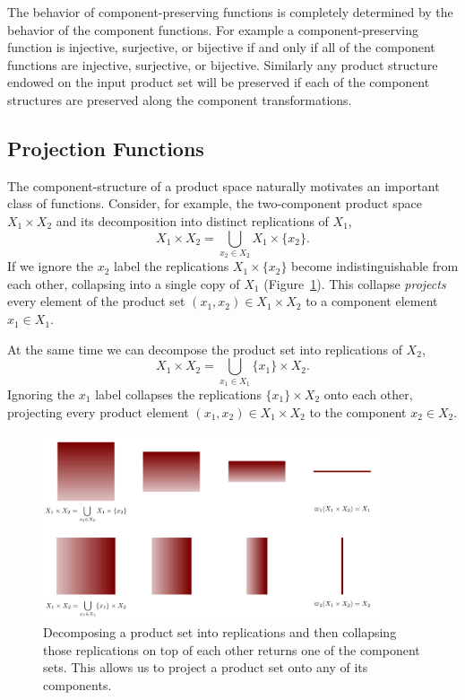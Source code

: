 \documentclass[
  letterpaper,
  DIV=11,
  numbers=noendperiod]{scrartcl}
\begin{document}
The behavior of component-preserving functions is completely determined
by the behavior of the component functions. For example a
component-preserving function is injective, surjective, or bijective if
and only if all of the component functions are injective, surjective, or
bijective. Similarly any product structure endowed on the input product
set will be preserved if each of the component structures are preserved
along the component transformations.

\hypertarget{projection-functions}{%
\subsection{Projection Functions}\label{projection-functions}}

The component-structure of a product space naturally motivates an
important class of functions. Consider, for example, the two-component
product space \(X_{1} \times X_{2}\) and its decomposition into distinct
replications of \(X_{1}\), \[
X_{1} \times X_{2} = \bigcup_{x_{2} \in X_{2}} X_{1} \times \{ x_{2} \}.
\] If we ignore the \(x_{2}\) label the replications
\(X_{1} \times \{ x_{2} \}\) become indistinguishable from each other,
collapsing into a single copy of \(X_{1}\)
(Figure~\ref{fig-projection}). This collapse \emph{projects} every
element of the product set \((x_{1}, x_{2}) \in X_{1} \times X_{2}\) to
a component element \(x_{1} \in X_{1}\).

At the same time we can decompose the product set into replications of
\(X_{2}\), \[
X_{1} \times X_{2} = \bigcup_{x_{1} \in X_{1}} \{ x_{1} \} \times X_{2}.
\] Ignoring the \(x_{1}\) label collapses the replications
\(\{ x_{1} \} \times X_{2}\) onto each other, projecting every product
element \((x_{1}, x_{2}) \in X_{1} \times X_{2}\) to the component
\(x_{2} \in X_{2}\).

\begin{figure}

{\centering \includegraphics[width=0.9\textwidth,height=\textheight]{figures/projection/projection.pdf}

}

\caption{\label{fig-projection}Decomposing a product set into
replications and then collapsing those replications on top of each other
returns one of the component sets. This allows us to project a product
set onto any of its components.}

\end{figure}
\end{document}
